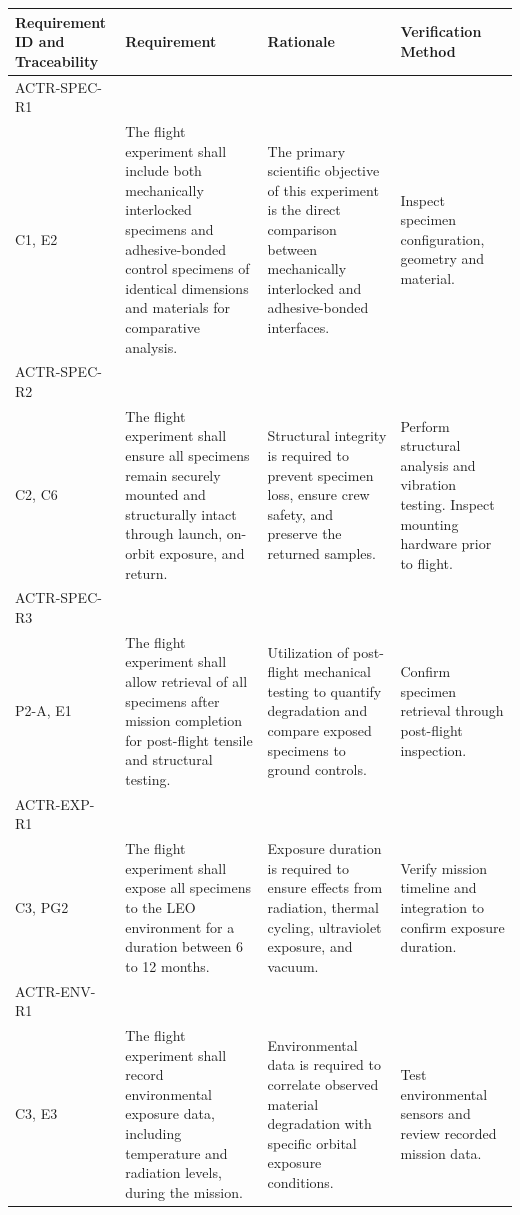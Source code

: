 \documentclass[conf]{new-aiaa}
\begin{document}
\begin{table}[H]
    \centering
    \footnotesize
    \setlength{\tabcolsep}{4pt}
    \renewcommand{\arraystretch}{1.15}
    \begin{tabularx}{\textwidth}{@{}>{\raggedright\arraybackslash}m{2.4cm}YYY@{}}
    \toprule
    \textbf{Requirement ID and Traceability} & \textbf{Requirement} & \textbf{Rationale} & \textbf{Verification Method} \\
    \midrule
    ACTR-SPEC-R1\\C1, E2 &
    The flight experiment shall include both mechanically interlocked specimens and adhesive-bonded control specimens of identical dimensions and materials for comparative analysis. &
    The primary scientific objective of this experiment is the direct comparison between mechanically interlocked and adhesive-bonded interfaces. &
    Inspect specimen configuration, geometry and material. \\ \hline

    ACTR-SPEC-R2\\C2, C6 &
    The flight experiment shall ensure all specimens remain securely mounted and structurally intact through launch, on-orbit exposure, and return. &
    Structural integrity is required to prevent specimen loss, ensure crew safety, and preserve the returned samples. &
    Perform structural analysis and vibration testing. Inspect mounting hardware prior to flight. \\ \hline

    ACTR-SPEC-R3\\P2-A, E1 &
    The flight experiment shall allow retrieval of all specimens after mission completion for post-flight tensile and structural testing. &
    Utilization of post-flight mechanical testing to quantify degradation and compare exposed specimens to ground controls. &
    Confirm specimen retrieval through post-flight inspection. \\ \hline

    ACTR-EXP-R1\\C3, PG2 &
    The flight experiment shall expose all specimens to the LEO environment for a duration between 6 to 12 months. &
    Exposure duration is required to ensure effects from radiation, thermal cycling, ultraviolet exposure, and vacuum. &
    Verify mission timeline and integration to confirm exposure duration. \\ \hline

    ACTR-ENV-R1\\C3, E3 &
    The flight experiment shall record environmental exposure data, including temperature and radiation levels, during the mission. &
    Environmental data is required to correlate observed material degradation with specific orbital exposure conditions. &
    Test environmental sensors and review recorded mission data. \\ \hline


\end{tabularx}
\end{table}
\end{document}
